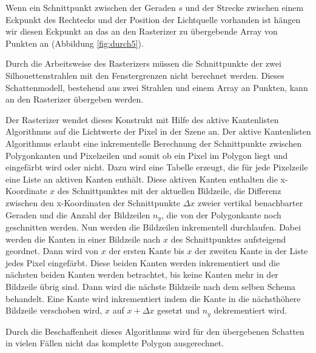 Wenn ein Schnittpunkt zwischen der Geraden $s$ und der Strecke zwischen einem Eckpunkt des Rechtecks
und der Position der Lichtquelle vorhanden ist hängen wir diesen Eckpunkt an das an den Rasterizer
zu übergebende Array von Punkten an (Abbildung \ref{fig:durch5}).

Durch die Arbeitsweise des Rasterizers müssen die Schnittpunkte der zwei Silhouettenstrahlen mit den
Fenstergrenzen nicht berechnet werden. Dieses Schattenmodell, bestehend aus zwei Strahlen und einem
Array an Punkten, kann an den Rasterizer übergeben werden.

Der Rasterizer wendet dieses Konstrukt mit Hilfe des aktive Kantenlisten Algorithmus auf die
Lichtwerte der Pixel in der Szene an. Der aktive Kantenlisten Algorithmus erlaubt eine inkrementelle
Berechnung der Schnittpunkte zwischen Polygonkanten und Pixelzeilen und somit ob ein Pixel
im Polygon liegt und eingefärbt wird oder nicht. Dazu wird eine Tabelle erzeugt, die für jede Pixelzeile eine Liste an aktiven Kanten
enthält. Diese aktiven Kanten enthalten die x-Koordinate $x$ des Schnittpunktes mit der aktuellen Bildzeile, die
Differenz zwischen den x-Koordinaten der Schnittpunkte $\Delta x$ zweier vertikal benachbarter
Geraden und die Anzahl der Bildzeilen $n_y$, die von der Polygonkante noch geschnitten werden. Nun
werden die Bildzeilen inkrementell durchlaufen. Dabei werden die Kanten in einer Bildzeile nach $x$
des Schnittpunktes aufsteigend geordnet. Dann wird von $x$ der ersten Kante bis $x$ der zweiten Kante in der Liste
jedes Pixel eingefärbt. Diese beiden Kanten werden inkrementiert und die nächsten beiden Kanten werden
betrachtet, bis keine Kanten mehr in der Bildzeile übrig sind. Dann wird die nächste Bildzeile
nach dem selben Schema behandelt. Eine Kante wird inkrementiert indem die Kante in die nächsthöhere Bildzeile verschoben
wird, $x$ auf $x + \Delta x$ gesetzt und $n_y$ dekrementiert wird.


Durch die Beschaffenheit dieses Algorithmus wird für den übergebenen Schatten in vielen Fällen nicht das komplette
Polygon ausgerechnet.

